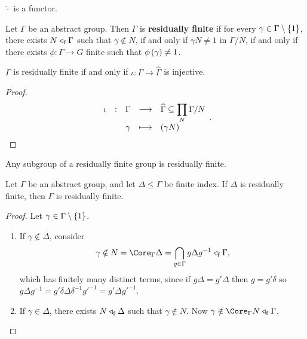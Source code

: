 \begin{corollary}
$ \widehat{\cdot} $ is a functor.
\end{corollary}

\pagebreak


\begin{definition}
Let $ \Gamma $ be an abstract group. Then $ \Gamma $ is \textbf{residually finite} if for every $ \gamma \in \Gamma \setminus \cbr{1} $, there exists $ N \triangleleft_{\mathrm{f}} \Gamma $ such that $ \gamma \notin N $, if and only if $ \gamma N \ne 1 $ in $ \Gamma / N $, if and only if there exists $ \phi : \Gamma \to G $ finite such that $ \phi\br{\gamma} \ne 1 $.
\end{definition}

\begin{proposition}
$ \Gamma $ is residually finite if and only if $ \iota : \Gamma \to \widehat{\Gamma} $ is injective.
\end{proposition}

\begin{proof}
$$ \function[\iota]{\Gamma}{\widehat{\Gamma} \subseteq \prod_N \Gamma / N}{\gamma}{\br{\gamma N}}. $$
\end{proof}

\begin{proposition}
Any subgroup of a residually finite group is residually finite.
\end{proposition}

\begin{proposition}
Let $ \Gamma $ be an abstract group, and let $ \Delta \le \Gamma $ be finite index. If $ \Delta $ is residually finite, then $ \Gamma $ is residually finite.
\end{proposition}

\begin{proof}
Let $ \gamma \in \Gamma \setminus \cbr{1} $.
\begin{enumerate}[leftmargin=0.5in, label=Case \arabic*.]
\item If $ \gamma \notin \Delta $, consider
$$ \gamma \notin N = \Core_\Gamma \Delta = \bigcap_{g \in \Gamma} g\Delta g^{-1} \triangleleft_\f \Gamma, $$
which has finitely many distinct terms, since if $ g\Delta = g'\Delta $ then $ g = g'\delta $ so $ g\Delta g^{-1} = g'\delta\Delta\delta^{-1}g'^{-1} = g'\Delta g'^{-1} $.
\item If $ \gamma \in \Delta $, there exists $ N \triangleleft_{\mathrm{f}} \Delta $ such that $ \gamma \notin N $. Now $ \gamma \notin \Core_\Gamma N \triangleleft_\f \Gamma $.
\end{enumerate}
\end{proof}

